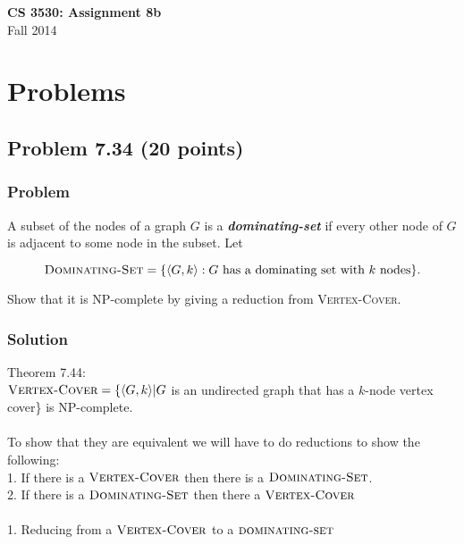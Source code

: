 \documentclass{article}
\begin{document}
\begin{empfile}

\begin{center}
\textbf{\Large CS 3530: Assignment 8b} \\[2mm]
Fall 2014
\end{center}

\raggedright

\section*{Problems}

\subsection*{Problem 7.34 (20 points)}

\subsubsection*{Problem}

A subset of the nodes of a graph $G$ is a \textit{\textbf{dominating-set}} 
if every other node of $G$ is adjacent to some node in the subset. Let 

$$\text{\textsc{Dominating-Set}}=\{\langle G,k\rangle:
G\text{ has a dominating set with $k$ nodes}\}.$$ 

Show that it is NP-complete by giving a reduction from \textsc{Vertex-Cover}.

\subsubsection*{Solution}
Theorem 7.44: \\
$\textsc{Vertex-Cover}=\{\langle G,k\rangle|G$ is an undirected graph that has a 
$k$-node vertex cover\} is NP-complete. \\ \ \\

To show that they are equivalent we will have to do reductions to show the following: \\
1. If there is a $\textsc{Vertex-Cover}$ then there is a $\textsc{Dominating-Set}$. \\ 
2. If there is a $\textsc{Dominating-Set}$ then there a $\textsc{Vertex-Cover}$ \\ \ \\


1. Reducing from a $\textsc{Vertex-Cover}$ to a $\textsc{dominating-set}$ 


\end{empfile}
\end{document}
